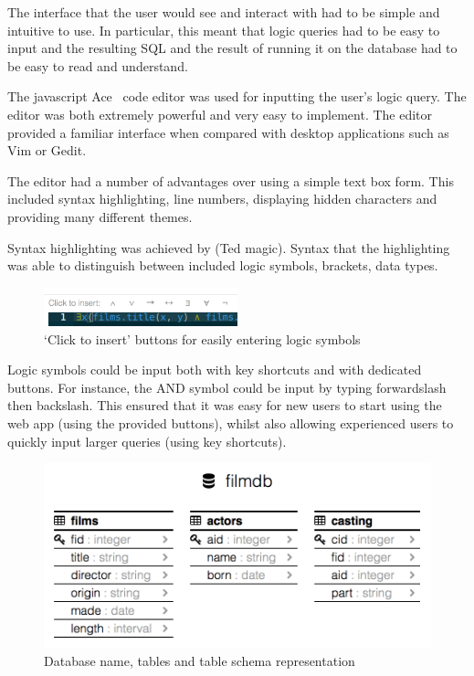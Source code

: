 \documentclass[a4paper, 11pt]{article}
\begin{document}
      The interface that the user would see and interact with had to be simple
      and intuitive to use. In particular, this meant that logic queries had to
      be easy to input and the resulting SQL and the result of running it on the
      database had to be easy to read and understand.

      The javascript Ace~\cite{aceEditor} code editor was used for inputting the
      user's logic query. The editor was both extremely powerful and very easy
      to implement. The editor provided a familiar interface when compared with
      desktop applications such as Vim or Gedit.

      The editor had a number of advantages over using a simple text box form.
      This included syntax highlighting, line numbers, displaying hidden
      characters and providing many different themes.

      Syntax highlighting was achieved by (Ted magic). Syntax that the
      highlighting was able to distinguish between included logic symbols,
      brackets, data types.

      \begin{figure}[h!]
        \centering
        \includegraphics[width=0.5\textwidth]{images/site_click_to_insert.png}
        \caption{`Click to insert' buttons for easily entering logic symbols}
      \end{figure}

      Logic symbols could be input both with key shortcuts and with dedicated
      buttons. For instance, the AND symbol could be input by typing
      forwardslash then backslash. This ensured that it was easy for new users
      to start using the web app (using the provided buttons), whilst also
      allowing experienced users to quickly input larger queries (using key
      shortcuts).

      \begin{figure}[h!]
        \centering
        \includegraphics[width=\textwidth]{images/site_schema.png}
        \caption{Database name, tables and table schema representation}
      \end{figure}
\end{document}

